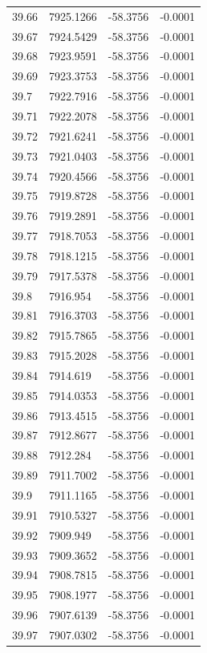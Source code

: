 \begin{table}[H]
\begin{tabular}{llll}
39.66 & 7925.1266 & -58.3756 & -0.0001 \\
39.67 & 7924.5429 & -58.3756 & -0.0001 \\
39.68 & 7923.9591 & -58.3756 & -0.0001 \\
39.69 & 7923.3753 & -58.3756 & -0.0001 \\
39.7 & 7922.7916 & -58.3756 & -0.0001 \\
39.71 & 7922.2078 & -58.3756 & -0.0001 \\
39.72 & 7921.6241 & -58.3756 & -0.0001 \\
39.73 & 7921.0403 & -58.3756 & -0.0001 \\
39.74 & 7920.4566 & -58.3756 & -0.0001 \\
39.75 & 7919.8728 & -58.3756 & -0.0001 \\
39.76 & 7919.2891 & -58.3756 & -0.0001 \\
39.77 & 7918.7053 & -58.3756 & -0.0001 \\
39.78 & 7918.1215 & -58.3756 & -0.0001 \\
39.79 & 7917.5378 & -58.3756 & -0.0001 \\
39.8 & 7916.954 & -58.3756 & -0.0001 \\
39.81 & 7916.3703 & -58.3756 & -0.0001 \\
39.82 & 7915.7865 & -58.3756 & -0.0001 \\
39.83 & 7915.2028 & -58.3756 & -0.0001 \\
39.84 & 7914.619 & -58.3756 & -0.0001 \\
39.85 & 7914.0353 & -58.3756 & -0.0001 \\
39.86 & 7913.4515 & -58.3756 & -0.0001 \\
39.87 & 7912.8677 & -58.3756 & -0.0001 \\
39.88 & 7912.284 & -58.3756 & -0.0001 \\
39.89 & 7911.7002 & -58.3756 & -0.0001 \\
39.9 & 7911.1165 & -58.3756 & -0.0001 \\
39.91 & 7910.5327 & -58.3756 & -0.0001 \\
39.92 & 7909.949 & -58.3756 & -0.0001 \\
39.93 & 7909.3652 & -58.3756 & -0.0001 \\
39.94 & 7908.7815 & -58.3756 & -0.0001 \\
39.95 & 7908.1977 & -58.3756 & -0.0001 \\
39.96 & 7907.6139 & -58.3756 & -0.0001 \\
39.97 & 7907.0302 & -58.3756 & -0.0001 \\

\end{tabular}
\end{table}
